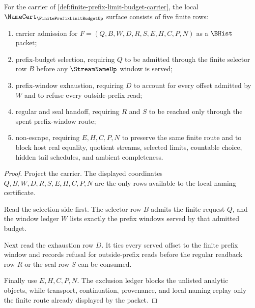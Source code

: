 \begin{theorem}
\label{thm:finite-prefix-limit-budget-namecert-obligations}
For the carrier of \autoref{def:finite-prefix-limit-budget-carrier}, the local $\NameCert_{\FinitePrefixLimitBudgetUp}$ surface consists of five finite rows:
\begin{enumerate}
\item carrier admission for $F=(Q,B,W,D,R,S,E,H,C,P,N)$ as a $\BHist$ packet;
\item prefix-budget selection, requiring $Q$ to be admitted through the finite selector row $B$ before any $\StreamNameUp$ window is served;
\item prefix-window exhaustion, requiring $D$ to account for every offset admitted by $W$ and to refuse every outside-prefix read;
\item regular and seal handoff, requiring $R$ and $S$ to be reached only through the spent prefix-window route;
\item non-escape, requiring $E,H,C,P,N$ to preserve the same finite route and to block host real equality, quotient streams, selected limits, countable choice, hidden tail schedules, and ambient completeness.
\end{enumerate}
\end{theorem}
\begin{proof}
Project the carrier. The displayed coordinates $Q,B,W,D,R,S,E,H,C,P,N$ are the only rows available to the local naming certificate.

Read the selection side first. The selector row $B$ admits the finite request $Q$, and the window ledger $W$ lists exactly the prefix windows served by that admitted budget.

Next read the exhaustion row $D$. It ties every served offset to the finite prefix window and records refusal for outside-prefix reads before the regular readback row $R$ or the seal row $S$ can be consumed.

Finally use $E,H,C,P,N$. The exclusion ledger blocks the unlisted analytic objects, while transport, continuation, provenance, and local naming replay only the finite route already displayed by the packet.
\end{proof}

